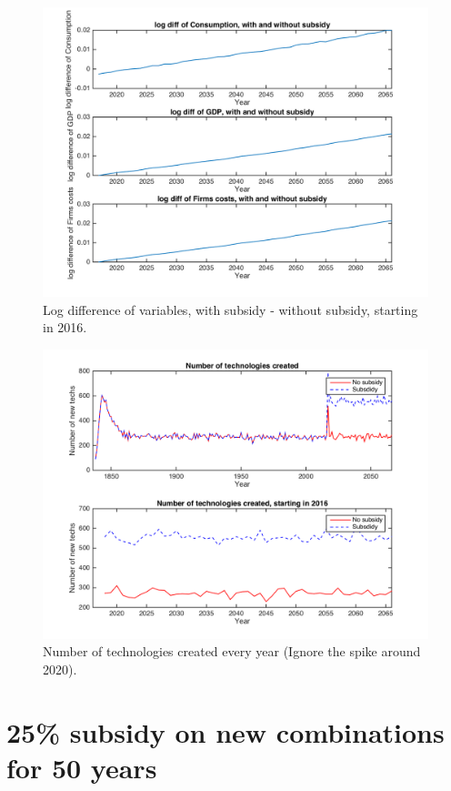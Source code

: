 \documentclass[a4paper,11pt]{article}
\theoremstyle{prop}
\theoremstyle{lemma}
\begin{document}
\begin{figure}
\centering
\includegraphics[scale=.6]{aggregates_diffNT_50y}
\caption{Log difference of variables, with subsidy - without subsidy, starting in 2016.}
\end{figure}

\begin{figure}
\centering
\includegraphics[scale=.6]{tech_creationNT_50y}
\caption{Number of technologies created every year (Ignore the spike around 2020).}
\end{figure}

\clearpage

\section*{25\% subsidy on new combinations for 50 years}
\end{document}

